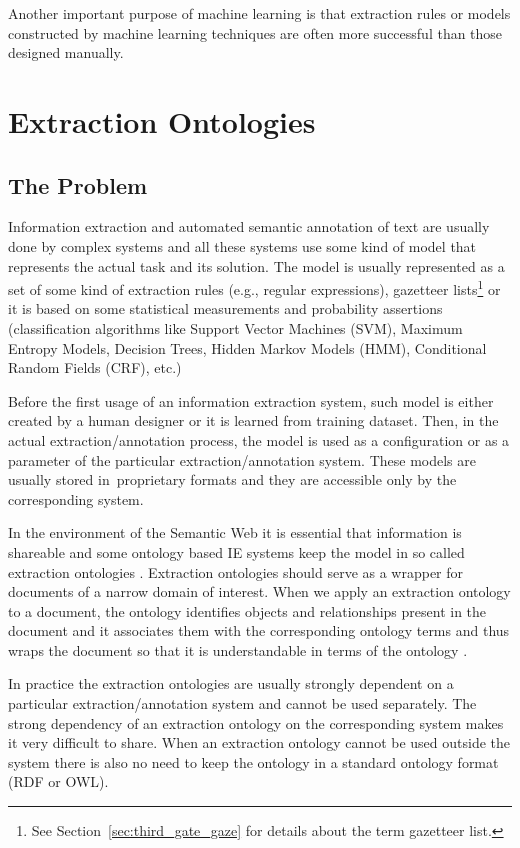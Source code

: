 Another important purpose of machine learning is that extraction rules or models constructed by machine learning techniques are often more successful than those designed manually.

\section{Extraction Ontologies}

\subsection{The Problem}

Information extraction and automated semantic annotation of text are usually done by complex systems and all these systems use some kind of model that represents the actual task and its solution. The model is usually represented as a set of some kind of extraction rules (e.g., regular expressions), gazetteer lists\footnote{See Section~\ref{sec:third_gate_gaze} for details about the term gazetteer list.} or it is based on some statistical measurements and probability assertions (classification algorithms like Support Vector Machines (SVM), Maximum Entropy Models, Decision Trees, Hidden Markov Models (HMM), Conditional Random Fields (CRF), etc.)



Before the first usage of an information extraction system, such model is either created by a human designer or it is learned from training dataset. Then, in the actual extraction/annotation process, the model is used as a configuration or as a parameter of the particular extraction/annotation system. These models are usually stored in~proprietary formats and they are accessible only by the corresponding system.



In the environment of the Semantic Web it is essential that information is shareable and some ontology based IE systems keep the model in so called extraction ontologies \cite{DBLP:conf/er/EmbleyTL02}. Extraction ontologies should serve as a wrapper for documents of a narrow domain of interest. When we apply an extraction ontology to a document, the ontology identifies objects and relationships present in the document and it associates them with the corresponding ontology terms and thus wraps the document so that it is understandable in terms of the ontology \cite{DBLP:conf/er/EmbleyTL02}.



In practice the extraction ontologies are usually strongly dependent on a particular extraction/annotation system and cannot be used separately. The strong dependency of an extraction ontology on the corresponding system makes it very difficult to share. When an extraction ontology cannot be used outside the system there is also no need to keep the ontology in a standard ontology format (RDF or OWL).



